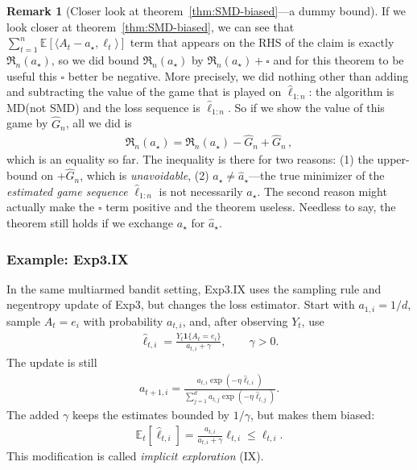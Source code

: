 \documentclass{article}
\theoremstyle{plain}
\theoremstyle{definition}
\newtheorem{remark}[theorem]{Remark}
\newcommand{\Reg}{\mathfrak{R}}
\newcommand{\E}{\mathbb E}
\newcommand{\mdalg}{\textsf{MD}\xspace}
\newcommand{\smdalg}{\textsf{SMD}\xspace}
\newcommand{\expthree}{\textsf{Exp3}\xspace}
\newcommand{\expthreeix}{\textsf{Exp3.IX}\xspace}
\newcommand{\hl}{\hat{\ell}\xspace}
\begin{document}
\begin{remark}[Closer look at theorem~\ref{thm:SMD-biased}---a dummy bound]
    \label{rem:dummy-bound}
    If we look closer at theorem~\ref{thm:SMD-biased}, we can see that
    $\sum_{t=1}^{n} \E[\langle A_t - a_\star, \ell_t\rangle]$ term
    that appears on the RHS of the claim is exactly $\Reg_n(a_\star)$,
    so we did bound $\Reg_n(a_\star)$ by $\Reg_n(a_\star) + \square$ and
    for this theorem to be useful this $\square$ better be negative.
    More precisely, we did nothing other than adding and subtracting the value of the game
    that is played on $\hl_{1:n}$: the algorithm is \mdalg (not {\smdalg})
    and the loss sequence is $\hl_{1:n}$.
    So if we show the value of this game by $\hat{G}_n$, all we did is
    \begin{align*}
        \Reg_n(a_\star) = \Reg_n(a_\star) - \hat{G}_n + \hat{G}_n \,,
    \end{align*}
    which is an equality so far.
    The inequality is there for two reasons: (1) the upper-bound on
    $+ \hat{G}_n$, which is \textit{unavoidable},
    (2) $a_\star \neq \hat{a}_\star$---the true minimizer of the
    \textit{estimated game sequence} $\hl_{1:n}$ is not necessarily
    $a_\star$.
    The second reason might actually make the $\square$ term positive
    and the theorem useless.
    Needless to say, the theorem still holds if we exchange $a_\star$
    for $\hat{a}_\star$.
\end{remark}


\subsubsection{Example: \expthreeix}
In the same multiarmed bandit setting, \expthreeix uses the sampling rule
and negentropy update of \expthree, but changes the loss estimator.
Start with $a_{1,i}=1/d$, sample $A_t=e_i$ with probability $a_{t,i}$,
and, after observing $Y_t$, use
\begin{align*}
    \hl_{t,i}
    = \frac{Y_t\mathbf{1}\{A_t=e_i\}}{a_{t,i}+\gamma},
    \qquad \gamma>0.
\end{align*}
The update is still
\begin{align*}
    a_{t+1,i}
    = \frac{a_{t,i}\exp(-\eta\hl_{t,i})}
    {\sum_{j=1}^d a_{t,j}\exp(-\eta\hl_{t,j})}.
\end{align*}
The added $\gamma$ keeps the estimates bounded by $1/\gamma$,
but makes them biased:
\begin{align*}
    \E_t[\hl_{t,i}]
    = \frac{a_{t,i}}{a_{t,i}+\gamma}\ell_{t,i}
    \leq \ell_{t,i}.
\end{align*}
This modification is called \emph{implicit exploration} (IX).
\end{document}
